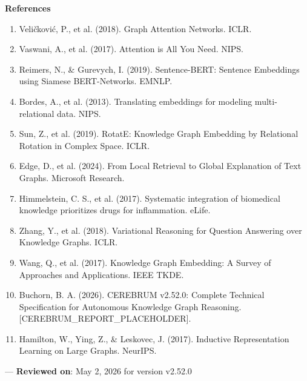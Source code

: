 \textbf{References}
\begin{enumerate}
\item Veličković, P., et al. (2018). Graph Attention Networks. ICLR.
\item Vaswani, A., et al. (2017). Attention is All You Need. NIPS.
\item Reimers, N., \& Gurevych, I. (2019). Sentence-BERT: Sentence Embeddings using Siamese BERT-Networks. EMNLP.
\item Bordes, A., et al. (2013). Translating embeddings for modeling multi-relational data. NIPS.
\item Sun, Z., et al. (2019). RotatE: Knowledge Graph Embedding by Relational Rotation in Complex Space. ICLR.
\item Edge, D., et al. (2024). From Local Retrieval to Global Explanation of Text Graphs. Microsoft Research.
\item Himmelstein, C. S., et al. (2017). Systematic integration of biomedical knowledge prioritizes drugs for infla\-mmation. eLife.
\item Zhang, Y., et al. (2018). Variational Reasoning for Question Answering over Knowledge Graphs. ICLR.
\item Wang, Q., et al. (2017). Knowledge Graph Embedding: A Survey of Approaches and Applic\-ations. IEEE TKDE.
\item Buchorn, B. A. (2026). CEREBRUM v2.52.0: Complete Technical Specif\-ication for Autonomous Knowledge Graph Reasoning. [CEREBRUM\_REPORT\_PLACEHOLDER].
\item Hamilton, W., Ying, Z., \& Leskovec, J. (2017). Inductive Repres\-entation Learning on Large Graphs. NeurIPS.

\end{enumerate}
---
\textbf{Reviewed on}: May 2, 2026 for version v2.52.0
